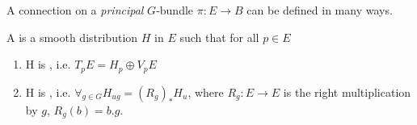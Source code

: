 % 
% 

A connection on a \emph{principal} $G$-bundle $\pi:E\rightarrow B$ can be defined in many ways. 

\begin{definition}
A  is a smooth distribution $H$ in $E$ such that for all $p\in E$
	\begin{enumerate}
	\item H is , i.e. $T_p E=H_p \oplus V_pE$
	\item H is , i.e. $\forall_{g\in G} H_{ug}=(R_g)_* H_u$, where $R_g:E\rightarrow E$ is the right  multiplication by $g$, $R_g(b)=b.g$.
	\end{enumerate}
\end{definition}

